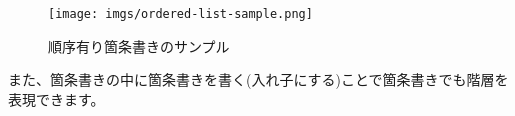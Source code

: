 \begin{Shaded}
\begin{Highlighting}[]
\DataTypeTok{\textless{}}\DataTypeTok{\textgreater{}}\DataTypeTok{\textless{}/}\DataTypeTok{\textgreater{}}
\DataTypeTok{\textless{}}\DataTypeTok{\textgreater{}}
  \DataTypeTok{\textless{}}\DataTypeTok{\textgreater{}}\DataTypeTok{\textless{}/}\DataTypeTok{\textgreater{}}
  \DataTypeTok{\textless{}}\DataTypeTok{\textgreater{}}\DataTypeTok{\textless{}/}\DataTypeTok{\textgreater{}}
  \DataTypeTok{\textless{}}\DataTypeTok{\textgreater{}}\DataTypeTok{\textless{}/}\DataTypeTok{\textgreater{}}
  \DataTypeTok{\textless{}}\DataTypeTok{\textgreater{}}\DataTypeTok{\textless{}/}\DataTypeTok{\textgreater{}}
  \DataTypeTok{\textless{}}\DataTypeTok{\textgreater{}}\DataTypeTok{\textless{}/}\DataTypeTok{\textgreater{}}
  \DataTypeTok{\textless{}}\DataTypeTok{\textgreater{}}\DataTypeTok{\textless{}/}\DataTypeTok{\textgreater{}}
  \DataTypeTok{\textless{}}\DataTypeTok{\textgreater{}}\DataTypeTok{\textless{}/}\DataTypeTok{\textgreater{}}
  \DataTypeTok{\textless{}}\DataTypeTok{\textgreater{}}\DataTypeTok{\textless{}/}\DataTypeTok{\textgreater{}}
\DataTypeTok{\textless{}/}\DataTypeTok{\textgreater{}}
\end{Highlighting}
\end{Shaded}

\begin{figure}
\centering
\texttt{[image: imgs/ordered-list-sample.png]}
\caption{順序有り箇条書きのサンプル}
\end{figure}

また、箇条書きの中に箇条書きを書く(入れ子にする)ことで箇条書きでも階層を表現できます。

